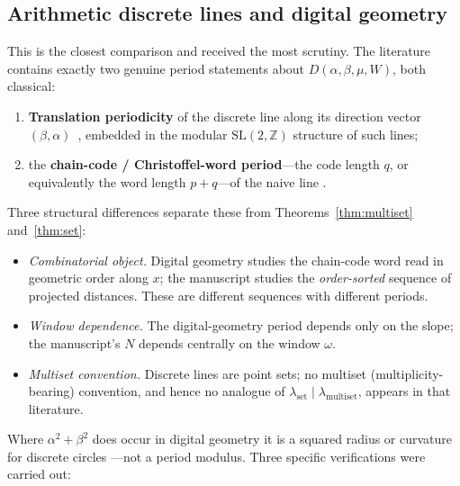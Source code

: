 \documentclass[11pt]{article}
\theoremstyle{plain}
\theoremstyle{remark}
\newcommand{\Z}{\mathbb{Z}}
\newcommand{\lmult}{\lambda_{\mathrm{multiset}}}
\newcommand{\lset}{\lambda_{\mathrm{set}}}
\begin{document}
\subsection{Arithmetic discrete lines and digital geometry}\label{ssec:dg}

This is the closest comparison and received the most scrutiny. The literature
contains exactly two genuine period statements about $D(\alpha,\beta,\mu,W)$, both
classical:
\begin{enumerate}[label=(\arabic*),leftmargin=2.2em,itemsep=2pt]
  \item \textbf{Translation periodicity} of the discrete line along its direction
        vector $(\beta,\alpha)$~\cite{Reveilles1991}, embedded in the modular
        $\mathrm{SL}(2,\Z)$ structure of such lines;
  \item the \textbf{chain-code / Christoffel-word period}---the code length $q$, or
        equivalently the word length $p+q$---of the naive line
        \cite{BerstelEtAl2008,LachaudSaid2013,KletteRosenfeld2004}.
\end{enumerate}
Three structural differences separate these from Theorems~\ref{thm:multiset}
and~\ref{thm:set}:
\begin{itemize}[leftmargin=1.8em,itemsep=2pt]
  \item \emph{Combinatorial object.} Digital geometry studies the chain-code word
        read in geometric order along $x$; the manuscript studies the
        \emph{order-sorted} sequence of projected distances. These are different
        sequences with different periods.
  \item \emph{Window dependence.} The digital-geometry period depends only on the
        slope; the manuscript's $N$ depends centrally on the window $\omega$.
  \item \emph{Multiset convention.} Discrete lines are point sets; no multiset
        (multiplicity-bearing) convention, and hence no analogue of
        $\lset\mid\lmult$, appears in that literature.
\end{itemize}
Where $\alpha^2+\beta^2$ does occur in digital geometry it is a squared radius or
curvature for discrete circles
\cite{FiorioJametToutant2006}---not a period modulus. Three specific verifications
were carried out:
\end{document}
